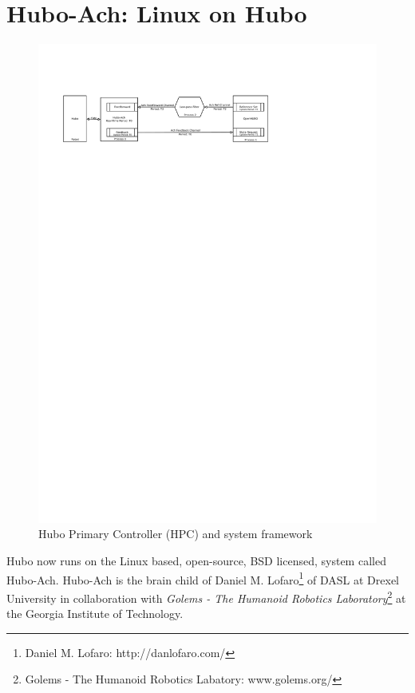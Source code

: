 \section{Hubo-Ach: Linux on Hubo}

\begin{figure}[thpb]
  \centering
\includegraphics[width=2.0\columnwidth]{./pix/hubo-ach-diagram-OpenHUBO.pdf}
  \caption{Hubo Primary Controller (HPC) and system framework}
  \label{fig:graph}
\end{figure}


Hubo now runs on the Linux based, open-source, BSD licensed, system called Hubo-Ach.  
Hubo-Ach is the brain child of Daniel M. Lofaro\footnote{Daniel M. Lofaro: http://danlofaro.com/} of DASL at Drexel University in collaboration with \textit{Golems - The Humanoid Robotics Laboratory}\footnote{Golems - The Humanoid Robotics Labatory: www.golems.org/} at the Georgia Institute of Technology.  

